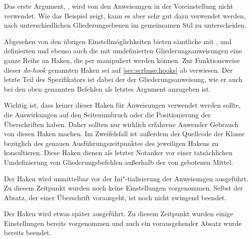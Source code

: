 Das erste Argument, , wird von den Anweisungen in der
Voreinstellung nicht verwendet. Wie das Beispiel zeigt, kann es aber sehr gut
dazu verwendet werden, nach unterschiedlichen Gliederungsebenen im gemeinsamen
Stil  zu unterscheiden.%
\EndIndexGroup


\begin{Declaration}
%
%
%
%
%
%
\end{Declaration}
%
Abgesehen von den übrigen Einstellmöglichkeiten bieten sämtliche mit
,
 und
 definierten und ebenso auch die
mit  umdefinierten
Gliederungsanweisungen eine ganze Reihe an Haken, die per
 manipuliert werden können. Zur
Funktionsweise dieser \emph{do-hook} genannten Haken sei auf
\autoref{sec:scrbase.hooks} ab  verwiesen. Der
letzte Teil des Spezifikators ist dabei der  der
Gliederungsanweisung, wie er auch bei den oben genannten Befehlen als letztes
Argument anzugeben ist.

Wichtig ist, dass keiner dieser Haken für Anweisungen
verwendet werden sollte, die Auswirkungen auf den Seitenumbruch oder die
Positionierung der Überschriften haben. Daher sollten nur wirklich erfahrene
Anwender Gebrauch von diesen Haken machen. Im Zweifelsfall ist außerdem der
Quellcode der Klasse bezüglich des genauen Ausführungszeitpunktes des
jeweiligen Hakens zu konsultieren. Diese Haken dienen als letzter Notanker vor
einer tatsächlichen Umdefinierung von Gliederungsbefehlen außerhalb der von
\KOMAScript{} gebotenen Mittel.

Der Haken
 wird unmittelbar vor der
Ini"-tialisierung der Anweisungen ausgeführt. Zu diesem Zeitpunkt wurden noch
keine Einstellungen vorgenommen. Selbst der Absatz, der einer Überschrift
vorausgeht, ist noch nicht zwingend beendet.

Der Haken
 wird etwas später ausgeführt. Zu
diesem Zeitpunkt wurden einige Einstellungen bereits vorgenommen und auch ein
vorausgehender Absatz wurde bereits beendet.

